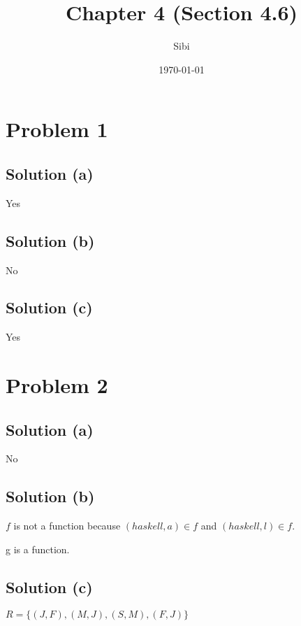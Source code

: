 \documentclass{article}
\begin{document}
\title{Chapter 4 (Section 4.6)}
\author{Sibi}
\date{\today}
\maketitle

\DeclarePairedDelimiter\abs{\lvert}{\rvert}%
\DeclarePairedDelimiter\norm{\lVert}{\rVert}%

\makeatletter
\let\oldabs\abs
\def\abs{\@ifstar{\oldabs}{\oldabs*}}
%
\let\oldnorm\norm
\def\norm{\@ifstar{\oldnorm}{\oldnorm*}}
\makeatother
\newpage

\section{Problem 1}

\subsection{Solution (a)}
Yes

\subsection{Solution (b)}
No

\subsection{Solution (c)}
Yes

\section{Problem 2}
\subsection{Solution (a)}
No

\subsection{Solution (b)}
$f$ is not a function because $(haskell,a) \in f$ and $(haskell,l) \in
f$.

g is a function.

\subsection{Solution (c)}
$R = \{(J,F), (M,J), (S,M), (F,J)\}$
\end{document}
